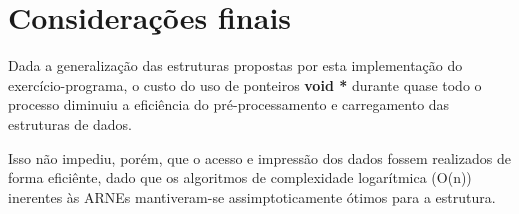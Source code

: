 \documentclass[a4paper,12pt]{article}
\begin{document}
\section{Considerações finais} 
    Dada a generalização das estruturas propostas por esta implementação
    do exercício-programa, o custo do uso de ponteiros \textbf{void *}
    durante quase todo o processo diminuiu a eficiência do
    pré-processamento e carregamento das estruturas de dados.

    Isso não impediu, porém, que o acesso e impressão dos dados fossem
    realizados de forma eficiênte, dado que os algoritmos de
    complexidade logarítmica (O(n)) inerentes às ARNEs mantiveram-se
    assimptoticamente ótimos para a estrutura.
\end{document}
